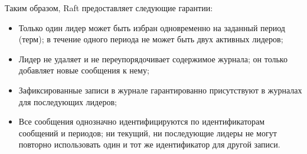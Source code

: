 Таким образом, Raft предоставляет следующие гарантии:

\begin{itemize}
    \item Только один лидер может быть избран одновременно на заданный период (терм);
        в течение одного периода не может быть двух активных лидеров;
    \item Лидер не удаляет и не переупорядочивает содержимое журнала; он только
        добавляет новые сообщения к нему;
    \item Зафиксированные записи в журнале гарантированно присутствуют в журналах
        для последующих лидеров;
    \item Все сообщения однозначно идентифицируются по идентификаторам сообщений
        и периодов; ни текущий, ни последующие лидеры не могут повторно использовать
        один и тот же идентификатор для другой записи.
\end{itemize}

